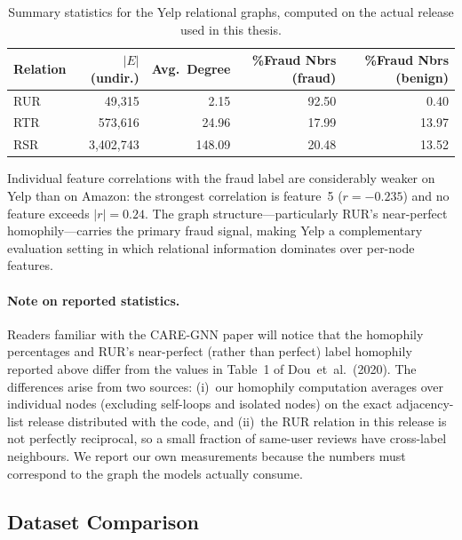 \begin{table}[h!]
\centering
\begin{tabular}{lrrrr}
\hline
Relation & $|E|$ (undir.) & Avg.\ Degree & \%Fraud Nbrs (fraud) & \%Fraud Nbrs (benign) \\
\hline
RUR & 49{,}315     & 2.15   & 92.50 & 0.40 \\
RTR & 573{,}616    & 24.96  & 17.99 & 13.97 \\
RSR & 3{,}402{,}743 & 148.09 & 20.48 & 13.52 \\
\hline
\end{tabular}
\caption{Summary statistics for the Yelp relational graphs, computed on the actual release used in this thesis.}
\label{tab:yelp-stats}
\end{table}

Individual feature correlations with the fraud label are considerably weaker on Yelp than on Amazon: the strongest correlation is feature~5 ($r = -0.235$) and no feature exceeds $|r| = 0.24$. The graph structure---particularly RUR's near-perfect homophily---carries the primary fraud signal, making Yelp a complementary evaluation setting in which relational information dominates over per-node features.

\paragraph{Note on reported statistics.} Readers familiar with the CARE-GNN paper will notice that the homophily percentages and RUR's near-perfect (rather than perfect) label homophily reported above differ from the values in Table~1 of Dou~et~al.~(2020). The differences arise from two sources: (i)~our homophily computation averages over individual nodes (excluding self-loops and isolated nodes) on the exact adjacency-list release distributed with the code, and (ii)~the RUR relation in this release is not perfectly reciprocal, so a small fraction of same-user reviews have cross-label neighbours. We report our own measurements because the numbers must correspond to the graph the models actually consume.

\subsection{Dataset Comparison}

